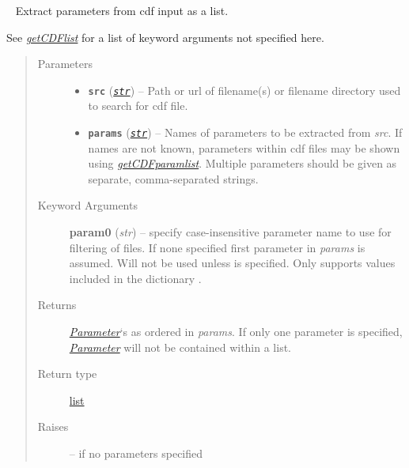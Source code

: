 \documentclass[letterpaper,10pt,english]{sphinxhowto}
\begin{document}
\begin{fulllineitems}
\label{swtools_doc:swtools.getCDFparams}~\label{swtools_doc:getcdfparams}
Extract parameters from cdf input as a list.

See {\hyperref[swtools_doc:getcdflist]{\emph{getCDFlist}}} for a list of keyword arguments not specified here.
\begin{quote}\begin{description}
\item[{Parameters}] \leavevmode\begin{itemize}
\item {} 
\textbf{\texttt{src}} (\href{https://docs.python.org/library/functions.html\#str}{\emph{\texttt{str}}}) -- Path or url of filename(s) or filename directory used to search for
cdf file.

\item {} 
\textbf{\texttt{params}} (\href{https://docs.python.org/library/functions.html\#str}{\emph{\texttt{str}}}) -- Names of parameters to be extracted from \emph{src}. If names are not
known, parameters within cdf files may be shown using
{\hyperref[swtools_doc:getcdfparamlist]{\emph{getCDFparamlist}}}. Multiple parameters should be given as
separate, comma-separated strings.

\end{itemize}

\item[{Keyword Arguments}] \leavevmode
\textbf{param0} (\emph{str}) --
specify case-insensitive parameter name to use for filtering of files. If none
specified first parameter in \emph{params} is assumed. Will not be
used unless  is specified. Only supports values included
in the dictionary .

\item[{Returns}] \leavevmode
{\hyperref[swtools_doc:parameter]{\emph{Parameter}}}`s as ordered in \emph{params}. If only one parameter is
specified, {\hyperref[swtools_doc:parameter]{\emph{Parameter}}} will not be contained within a list.

\item[{Return type}] \leavevmode
\href{https://docs.python.org/library/functions.html\#list}{list}

\item[{Raises}] \leavevmode
{} --
if no parameters specified


\end{description}
\end{quote}
\end{fulllineitems}
\end{document}
